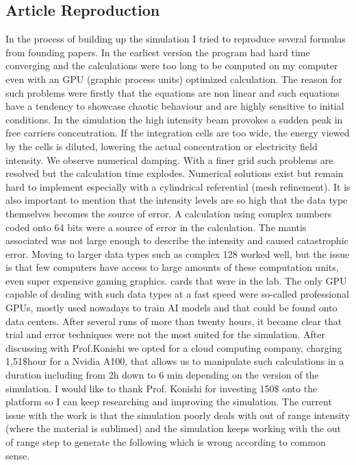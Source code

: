 \subsection{Article Reproduction}
In the process of building up the simulation I tried to reproduce several formulas from founding papers.
In the earliest version the program had hard time converging and the calculations were too long to be computed on my computer even with an GPU (graphic process units) optimized calculation. The reason for such problems were firstly that the equations are non linear and such equations have a tendency to showcase chaotic behaviour and are highly sensitive to initial conditions. In the simulation the high intensity beam provokes a sudden peak in free carriers concentration. If the integration cells are too wide, the energy viewed by the cells is diluted, lowering the actual concentration or electricity field intensity. We observe numerical damping. With a finer grid such problems are resolved but the calculation time explodes. Numerical solutions exist but remain hard to implement especially with a cylindrical referential (mesh refinement). It is also important to mention that the intensity levels are so high that the data type themselves becomes the source of error. A calculation using complex numbers coded onto 64 bits were a source of error in the calculation. The mantis associated was not large enough to describe the intensity and caused catastrophic error. Moving to larger data types such as complex 128 worked well, but the issue is that few computers have access to large amounts of these computation units, even super expensive gaming graphics. cards that were in the lab. The only GPU capable of dealing with such data types at a fast speed were so-called professional GPUs, mostly used nowadays to train AI models and that could be found onto data centers.
After several runs of more than twenty hours, it became clear that trial and error techniques were not the most suited for the simulation. After discussing with Prof.Konishi we opted for a cloud computing company, charging 1,51$\$$hour for a Nvidia A100, that allows us to manipulate such calculations in a duration including from 2h down to 6 min depending on the version of the simulation. I would like to thank Prof. Konishi for investing 150$\$$ onto the platform so I can keep researching and improving the simulation.
The current issue with the work is that the simulation poorly deals with out of range intensity (where the material is sublimed) and the simulation keeps working with the out of range step to generate the following which is wrong according to common sense.

